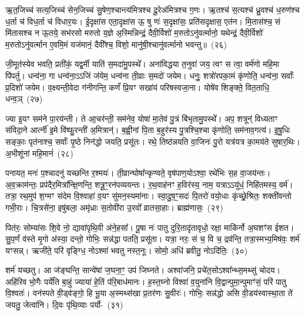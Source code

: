 ऋ॒त॒जिच्च॑ सत्य॒जिच्च॑ सेन॒जिच्च॑ सु॒षेण॒श्चान्त्य॑मित्रश्च दू॒रेअ॑मित्रश्च ग॒णः। ऋ॒तश्च॑ स॒त्यश्च॑ ध्रु॒वश्च॑ ध॒रुण॑श्च ध॒र्ता च॑ विध॒र्ता च॑ विधार॒यः। ई॒दृक्षा॑स एता॒दृक्षा॑स ऊ॒ षु णः॑ स॒दृक्षा॑सः॒ प्रति॑सदृक्षास॒ एत॑न। मि॒तास॑श्च॒ सं मि॑तासश्च न ऊ॒तये॒ सभ॑रसो मरुतो य॒ज्ञे अ॒स्मिन्निन्द्रं॒ दैवी॒र्विशो॑ म॒रुतो\-ऽनु॑वर्त्मानो॒ यथेन्द्रं॒ दैवी॒र्विशो॑ म॒रुतो\-ऽनु॑वर्त्मान ए॒वमि॒मं यज॑मानं॒ दैवी᳚श्च॒ विशो॒ मानु॑षी॒श्चानु॑वर्त्मानो भवन्तु॥~(२६)\ip

{\anuvakamend[{अ॒गा॒ꣳ स॒ह॒स्रा॒क्ष॒ दे॒वाः॒ स॒हस्र॑धारा॒मत्यꣳ॑हा॒ अनु॑वर्त्मानः॒ षोड॑श च}]}

जी॒मूत॑स्येव भवति॒ प्रती॑कं॒ यद्व॒र्मी याति॑ स॒मदा॑मु॒पस्थे᳚। अना॑विद्धया त॒नुवा॑ जय॒ त्वꣳ स त्वा॒ वर्म॑णो महि॒मा पि॑पर्तु। धन्व॑ना॒ गा धन्व॑ना॒\-ऽऽ\-जिं ज॑येम॒ धन्व॑ना ती॒व्राः स॒मदो॑ जयेम। धनुः॒ शत्रो॑रपका॒मं कृ॑णोति॒ धन्व॑ना॒ सर्वाः᳚ प्र॒दिशो॑ जयेम। व॒क्ष्यन्ती॒वेदा ग॑नीगन्ति॒ कर्णं॑ प्रि॒यꣳ सखा॑यं परिषस्वजा॒ना। योषे॑व शिङ्क्ते॒ वित॒ताधि॒ धन्व॒ञ्~(२७)\ip

ज्या इ॒यꣳ सम॑ने पा॒रय॑न्ती। ते आ॒चर॑न्ती॒ सम॑नेव॒ योषा॑ मा॒तेव॑ पु॒त्रं बि॑भृतामु॒पस्थे᳚। अप॒ शत्रून्॑ विध्यताꣳ संविदा॒ने आर्त्नी॑ इ॒मे वि॑ष्फु॒रन्ती॑ अ॒मित्रान्॑। ब॒ह्वी॒नां पि॒ता ब॒हुर॑स्य पु॒त्रश्चि॒श्चा कृ॑णोति॒ सम॑नाव॒गत्य॑। इ॒षु॒धिः सङ्काः॒ पृत॑नाश्च॒ सर्वाः᳚ पृ॒ष्ठे निन॑द्धो जयति॒ प्रसू॑तः। रथे॒ तिष्ठ॑न्नयति वा॒जिनः॑ पु॒रो यत्र॑यत्र का॒मय॑ते सुषार॒थिः। अ॒भीशू॑नां महि॒मानं॑~(२८)\ip

पनायत॒ मनः॑ प॒श्चादनु॑ यच्छन्ति र॒श्मयः॑। ती॒व्रान्घोषा᳚न्कृण्वते॒ वृष॑पाण॒यो\-ऽश्वा॒ रथे॑भिः स॒ह वा॒जय॑न्तः। अ॒व॒क्राम॑न्तः॒ प्रप॑दैर॒मित्रा᳚न्क्षि॒णन्ति॒ शत्रू॒ꣳ॒रन॑पव्ययन्तः। र॒थ॒वाह॑नꣳ ह॒विर॑स्य॒ नाम॒ यत्रा\-ऽऽ\-यु॑धं॒ निहि॑तमस्य॒ वर्म॑। तत्रा॒ रथ॒मुप॑ श॒ग्मꣳ स॑देम वि॒श्वाहा॑ व॒यꣳ सु॑मन॒स्यमा॑नाः। स्वा॒दु॒ष॒ꣳ॒सदः॑ पि॒तरो॑ वयो॒धाः कृ॑च्छ्रे॒श्रितः॒ शक्ती॑वन्तो गभी॒राः। चि॒त्रसे॑ना॒ इषु॑बला॒ अमृ॑ध्राः स॒तोवी॑रा उ॒रवो᳚ व्रातसा॒हाः। ब्राह्म॑णासः॒~(२९)\ip

पित॑रः॒ सोम्या॑सः शि॒वे नो॒ द्यावा॑\-पृथि॒वी अ॑ने॒हसा᳚। पू॒षा नः॑ पातु दुरि॒तादृ॑तावृधो॒ रक्षा॒ माकि॑र्नो अ॒घशꣳ॑स ईशत। सु॒प॒र्णं व॑स्ते मृ॒गो अ॑स्या॒ दन्तो॒ गोभिः॒ सन्न॑द्धा पतति॒ प्रसू॑ता। यत्रा॒ नरः॒ सं च॒ वि च॒ द्रव॑न्ति॒ तत्रा॒स्मभ्य॒मिष॑वः॒ शर्म॑ यꣳसन्न्। ऋजी॑ते॒ परि॑ वृङ्ग्धि॒ नो\-ऽश्मा॑ भवतु नस्त॒नूः। सोमो॒ अधि॑ ब्रवीतु॒ नो\-ऽदि॑तिः॒~(३०)\ip

शर्म॑ यच्छतु। आ ज॑ङ्घन्ति॒ सान्वे॑षां ज॒घना॒ꣳ॒ उप॑ जिघ्नते। अश्वा॑जनि॒ प्रचे॑त॒सो\-ऽश्वा᳚न्थ्स॒मथ्सु॑ चोदय। अहि॑रिव भो॒गैः पर्ये॑ति बा॒हुं ज्याया॑ हे॒तिं प॑रि॒बाध॑मानः। ह॒स्त॒घ्नो विश्वा॑ व॒युना॑नि वि॒द्वान्पुमा॒न्पुमाꣳ॑सं॒ परि॑ पातु वि॒श्वतः॑। वन॑स्पते वी॒ड्व॑ङ्गो॒ हि भू॒या अ॒स्मथ्स॑खा प्र॒तर॑णः सु॒वीरः॑। गोभिः॒ सन्न॑द्धो असि वी॒डय॑स्वास्था॒ता ते॑ जयतु॒ जेत्वा॑नि। दि॒वः पृ॑थि॒व्याः पर्यो-~(३१)\ip

